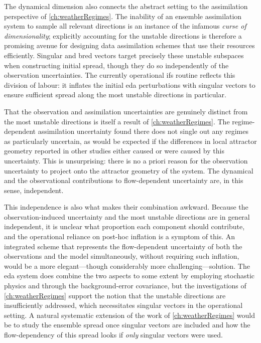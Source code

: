 \medskip

The dynamical dimension also connects the abstract setting to the
assimilation perspective of \cref{ch:weatherRegimes}. The inability of an
ensemble assimilation system to sample all relevant directions is an
instance of the infamous \emph{curse of dimensionality}; explicitly
accounting for the unstable directions is therefore a promising avenue for
designing data assimilation schemes that use their resources efficiently.
Singular and bred vectors target precisely these unstable subspaces when
constructing initial spread, though they do so independently of the
observation uncertainties. The currently operational \gls{ifs} routine
reflects this division of labour: it inflates the initial \gls{eda}
perturbations with singular vectors to ensure sufficient spread along the
most unstable directions in particular.

That the observation and assimilation uncertainties are genuinely distinct
from the most unstable directions is itself a result of
\cref{ch:weatherRegimes}. The regime-dependent assimilation uncertainty found
there does not single out any regimes as particularly uncertain, as would be
expected if the differences in local attractor geometry reported in other
studies either caused or were caused by this uncertainty. This is
unsurprising: there is no a priori reason for the observation uncertainty to
project onto the attractor geometry of the system. The dynamical and the
observational contributions to flow-dependent uncertainty are, in this sense,
independent.

This independence is also what makes their combination awkward. Because the
observation-induced uncertainty and the most unstable directions are in general
independent, it is unclear what proportion each component should
contribute, and the operational reliance on post-hoc inflation is a symptom
of this. An integrated scheme that represents the flow-dependent uncertainty
of both the observations and the model simultaneously, without requiring such
inflation, would be a more elegant---though considerably more
challenging---solution. The \gls{eda} system does combine the two aspects to
some extent by employing stochastic physics and through the background-error
covariance, but the investigations of \cref{ch:weatherRegimes} support
the notion that the unstable directions are insufficiently addressed, which
necessitates singular vectors in the operational setting.
A natural systematic extension of the work of \cref{ch:weatherRegimes}
would be to study the ensemble spread once singular vectors are included
and how the flow-dependency of this spread looks if \emph{only}
singular vectors were used.

